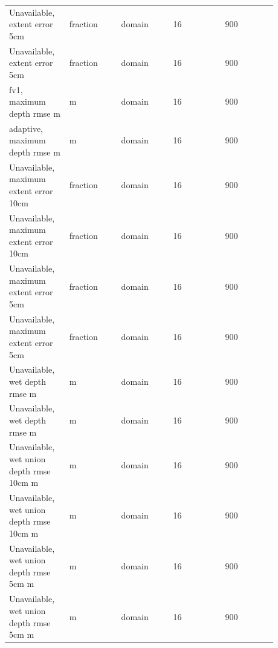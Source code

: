 \begin{longtable}{p{0.1760\linewidth}p{0.1760\linewidth}p{0.1760\linewidth}p{0.1760\linewidth}p{0.1760\linewidth}}
Unavailable, extent error 5cm & fraction & domain & 16 & 900 \\
Unavailable, extent error 5cm & fraction & domain & 16 & 900 \\
fv1, maximum depth rmse m & m & domain & 16 & 900 \\
adaptive, maximum depth rmse m & m & domain & 16 & 900 \\
Unavailable, maximum extent error 10cm & fraction & domain & 16 & 900 \\
Unavailable, maximum extent error 10cm & fraction & domain & 16 & 900 \\
Unavailable, maximum extent error 5cm & fraction & domain & 16 & 900 \\
Unavailable, maximum extent error 5cm & fraction & domain & 16 & 900 \\
Unavailable, wet depth rmse m & m & domain & 16 & 900 \\
Unavailable, wet depth rmse m & m & domain & 16 & 900 \\
Unavailable, wet union depth rmse 10cm m & m & domain & 16 & 900 \\
Unavailable, wet union depth rmse 10cm m & m & domain & 16 & 900 \\
Unavailable, wet union depth rmse 5cm m & m & domain & 16 & 900 \\
Unavailable, wet union depth rmse 5cm m & m & domain & 16 & 900 \\
\end{longtable}
